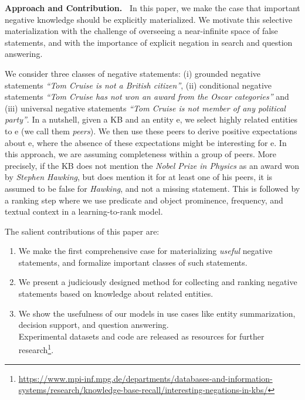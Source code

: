 \noindent
\textbf{Approach and Contribution.\ }
In this paper, we make the case that important negative knowledge should be explicitly materialized. We motivate this selective materialization with the challenge of overseeing a near-infinite space of false statements,
 and with the importance of explicit negation in search and question answering. %

We consider three classes of negative statements: (i) groun\-ded negative statements \textit{``Tom Cruise is not a British citizen''}, (ii) conditional negative statements \textit{``Tom Cruise has not won an award from the Oscar categories''} and (iii) universal negative statements \textit{``Tom Cruise is not member of any political party''}. In a nutshell, given a KB and an entity e, we select highly related entities to e (we call them \textit{peers}). We then use these peers to derive positive expectations about e, where the absence of these expectations might be interesting for e. In this approach, we are assuming completeness within a group of peers. More precisely, if the KB does not mention the \textit{Nobel Prize in Physics} as an award won by \textit{Stephen Hawking}, but does mention it for at least one of his peers, it is assumed to be false for \textit{Hawking}, and not a missing statement. This is followed by a ranking step where we use predicate and object prominence, frequency, and textual context in a  learning-to-rank model.


The salient contributions of this paper are:

\begin{enumerate}
    \item We make the first comprehensive case for materializing \textit{useful} negative statements, and formalize important classes of such statements.
    \item We present a judiciously designed method for collecting and ranking negative statements based on knowledge about related entities.
    \item We show the usefulness of our models in use cases like entity summarization, decision support, and question answering.\\
Experimental datasets and code are released as resources for further research\footnote{\url{https://www.mpi-inf.mpg.de/departments/databases-and-information-systems/research/knowledge-base-recall/interesting-negations-in-kbs/}}.
\end{enumerate}


